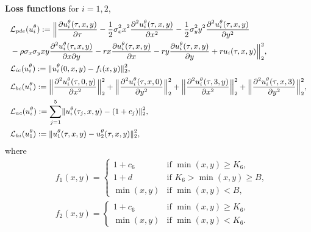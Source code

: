 \documentclass[11pt,reqno]{article}
\numberwithin{equation}{section}
\begin{document}
{\noindent \textbf{Loss functions} 
%
\qquad $\mbox{for } i = 1, 2$,
%
\begin{equation*} \small %
\begin{aligned}
    & \mathcal{L}_{pde} (u_i^{\theta})
    := \Big\lVert 
    \frac{\partial u_i^{\theta}(\tau,x,y)}{\partial \tau}
    - \frac{1}{2} \sigma_x^2 x^2 \frac{\partial^2 u_i^{\theta}(\tau,x,y)}{\partial x^2}
    - \frac{1}{2} \sigma_y^2 y^2 \frac{\partial^2 u_i^{\theta}(\tau,x,y)}{\partial y^2} \\
    & - \rho \sigma_x \sigma_y x y \frac{\partial^2 u_i^{\theta}(\tau,x,y)}{\partial x \partial y} 
    - r x \frac{\partial u_i^{\theta}(\tau,x,y)}{\partial x} 
    - r y \frac{\partial u_i^{\theta}(\tau,x,y)}{\partial y}
    + ru_i(\tau,x,y)
    \Big\rVert_2^2, \\
    & \mathcal{L}_{ic} (u_i^{\theta}) 
    := \lVert 
    u_i^{\theta}(0,x,y) - f_i(x,y)
    \rVert_2^2, \\
    & \mathcal{L}_{bc} (u_i^{\theta})
    := \Big\lVert 
    \frac{\partial^2 u_i^{\theta}(\tau,0,y)}
    {\partial x^2}
    \Big\rVert_2^2
    + \Big\lVert 
    \frac{\partial^2 u_i^{\theta}(\tau,x,0)}
    {\partial y^2}
    \Big\rVert_2^2
    + \Big\lVert 
    \frac{\partial^2 u_i^{\theta}(\tau,3,y)}
    {\partial x^2}
    \Big\rVert_2^2
    + \Big\lVert 
    \frac{\partial^2 u_i^{\theta}(\tau,x,3)}
    {\partial y^2}
    \Big\rVert_2^2, \\
    & \mathcal{L}_{ac} (u_i^{\theta})
    := \sum_{j=1}^5 
    \lVert 
    u_i^{\theta}(\tau_j,x,y) - (1 + c_j)
    \rVert_2^2, \\
    & \mathcal{L}_{ki} (u_1^{\theta})
    := \lVert 
    u_1^{\theta}(\tau,x,y) - u_2^{\theta}(\tau,x,y)
    \rVert_2^2, \\
\end{aligned}
\end{equation*}
where
\begin{equation*}
\begin{aligned}
    & f_1(x,y) = 
    \begin{cases}
    1 + c_6
    & \mbox{if } 
    \min (x,y) \ge K_6, \\
    1 + d
    & \mbox{if }  
    K_6 > \min (x,y) \ge B, \\
    \min (x,y)
    & \mbox{if }  
    \min (x,y) 
    < B,
    \end{cases} \\
    & f_2(x,y) = 
    \begin{cases}
    1 + c_6
    & \mbox{if } 
    \min (x,y) \ge K_6, \\
    \min (x,y) 
    & \mbox{if }  
    \min (x,y) 
    < K_6.
    \end{cases}
\end{aligned}
\end{equation*}

}
\end{document}
